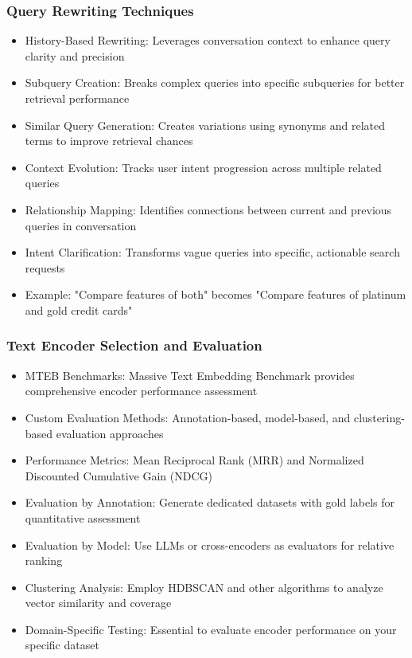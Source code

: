 \begin{frame}[fragile]\frametitle{Query Rewriting Techniques}
      \begin{itemize}
        \item History-Based Rewriting: Leverages conversation context to enhance query clarity and precision
        \item Subquery Creation: Breaks complex queries into specific subqueries for better retrieval performance
        \item Similar Query Generation: Creates variations using synonyms and related terms to improve retrieval chances
        \item Context Evolution: Tracks user intent progression across multiple related queries
        \item Relationship Mapping: Identifies connections between current and previous queries in conversation
        \item Intent Clarification: Transforms vague queries into specific, actionable search requests
        \item Example: "Compare features of both" becomes "Compare features of platinum and gold credit cards"
      \end{itemize}
\end{frame}

\begin{frame}[fragile]\frametitle{Text Encoder Selection and Evaluation}
      \begin{itemize}
        \item MTEB Benchmarks: Massive Text Embedding Benchmark provides comprehensive encoder performance assessment
        \item Custom Evaluation Methods: Annotation-based, model-based, and clustering-based evaluation approaches
        \item Performance Metrics: Mean Reciprocal Rank (MRR) and Normalized Discounted Cumulative Gain (NDCG)
        \item Evaluation by Annotation: Generate dedicated datasets with gold labels for quantitative assessment
        \item Evaluation by Model: Use LLMs or cross-encoders as evaluators for relative ranking
        \item Clustering Analysis: Employ HDBSCAN and other algorithms to analyze vector similarity and coverage
        \item Domain-Specific Testing: Essential to evaluate encoder performance on your specific dataset
      \end{itemize}
\end{frame}

